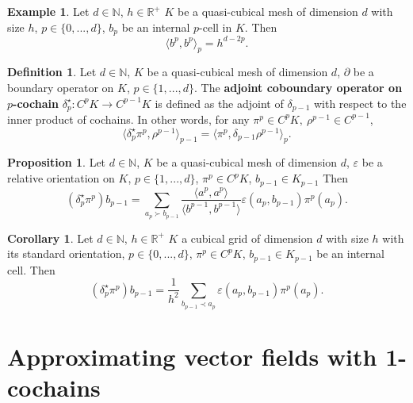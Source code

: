 \documentclass[fleqn]{article}
\theoremstyle{definition}
\newtheorem{proposition}[theorem]{Proposition}
\newtheorem{corollary}[theorem]{Corollary}
\newtheorem{definition}[theorem]{Definition}
\newtheorem{example}[theorem]{Example}
\newcommand{\N}{\mathbb{N}}
\newcommand{\R}{\mathbb{R}}
\newcommand{\inner}[2]{\langle#1,#2\rangle}
\begin{document}
\begin{example}
  Let
    $d \in \N$,
    $h \in \R^+$
    $K$ be a quasi-cubical mesh of dimension $d$ with size $h$,
    $p \in \{0, ..., d\}$,
    $b_p$ be an internal $p$-cell in $K$.
  Then
  \begin{equation}
    \inner{b^p}{b^p}_p = h^{d - 2 p}.
  \end{equation}
\end{example}

\begin{definition}
  Let
    $d \in \N$,
    $K$ be a quasi-cubical mesh of dimension $d$,
    $\partial$ be a boundary operator on $K$,
    $p \in \{1, ..., d\}$.
  The \textbf{adjoint coboundary operator on $p$-cochain}
  $\delta^\star_p \colon C^p K \to C^{p - 1} K$
  is defined as the adjoint of $\delta_{p - 1}$
  with respect to the inner product of cochains.
  In other words, for any $\pi^p \in C^p K,\ \rho^{p - 1} \in C^{p - 1}$,
  \begin{equation}
    \inner{\delta_p^\star \pi^p}{\rho^{p - 1}}_{p - 1}
    = \inner{\pi^p}{\delta_{p - 1} \rho^{p - 1}}_p.
  \end{equation}
\end{definition}
\begin{proposition}
  Let
    $d \in \N$,
    $K$ be a quasi-cubical mesh of dimension $d$,
    $\varepsilon$ be a relative orientation on $K$,
    $p \in \{1, ..., d\}$,
    $\pi^p \in C^p K$,
    $b_{p - 1} \in K_{p - 1}$
  Then
  \begin{equation}
    (\delta^\star_p \pi^p) b_{p - 1} =
    \sum_{a_p \succ b_{p - 1}}
      \frac
      {\inner{a^p}{a^p}}
      {\inner{b^{p - 1}}{b^{p - 1}}}
      \varepsilon(a_p, b_{p - 1})
      \pi^p(a_p).
  \end{equation}
\end{proposition}

\begin{corollary}
  Let
    $d \in \N$,
    $h \in \R^+$
    $K$ a cubical grid of dimension $d$ with size $h$
      with its standard orientation,
    $p \in \{0, ..., d\}$,
    $\pi^p \in C^p K$,
    $b_{p - 1} \in K_{p - 1}$ be an internal cell.
  Then
  \begin{equation}
    (\delta^\star_p \pi^p) b_{p - 1} =
    \frac{1}{h^2}
    \sum_{b_{p - 1} \prec a_p}
      \varepsilon(a_p, b_{p - 1})
      \pi^p(a_p).
  \end{equation}
\end{corollary}

\section{Approximating vector fields with 1-cochains}
\end{document}
